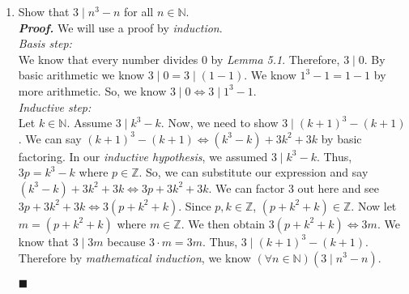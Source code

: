 \documentclass[11pt,a4paper]{article}
\begin{document}
\begin{enumerate}
\begin{enumerate}
    \end{enumerate}

    \item 
    Show that $3 \mid n^3 - n $ for all $n \in \mathbb{N}$. \\
    \emph{\textbf{Proof.}} We will use a proof by \emph{induction}. \\
    \emph{Basis step:} \\
    We know that every number divides 0 by \emph{Lemma 5.1}. Therefore, $3 \mid 0 $.
    By basic arithmetic we know $3 \mid 0 = 3 \mid (1 - 1)$. We know $1^3 - 1 = 1 - 1 $ by more arithmetic. So, we know $ 3 \mid 0 \Leftrightarrow 3 \mid 1^3 - 1 $. \\
    \emph{Inductive step:} \\
    Let $k \in \mathbb{N} $. Assume $3 \mid k^3 - k $. Now, we need to show $3 \mid (k + 1)^3 - (k + 1) $. 
    We can say $(k + 1)^3 - (k + 1) \Leftrightarrow (k^3 - k) + 3k^2 + 3k $ by basic factoring. In our \emph{inductive hypothesis}, we assumed $3 \mid k^3 - k $.
    Thus, $3p = k^3 - k $ where $p \in \mathbb{Z} $. So, we can substitute our expression and say $(k^3 - k) + 3k^2 + 3k \Leftrightarrow 3p + 3k^2 + 3k $. 
    We can factor 3 out here and see $3p + 3k^2 + 3k \Leftrightarrow 3 (p + k^2 + k) $. Since $p, k \in \mathbb{Z} $, $(p + k^2 + k) \in \mathbb{Z} $. Now let $m = (p + k^2 + k)$ where $m \in \mathbb{Z}$.
    We then obtain $3 (p + k^2 + k) \Leftrightarrow 3m$. We know that $3 \mid 3m $ because $3 \cdot m = 3m $. Thus, $3 \mid (k + 1)^ 3 - (k + 1) $. \\
    Therefore by \emph{mathematical induction}, we know $(\forall n \in \mathbb{N})(3 \mid n^3 - n) $.
    \begin{flushright}
        $\blacksquare$
    \end{flushright}


\end{enumerate}
\end{document}
